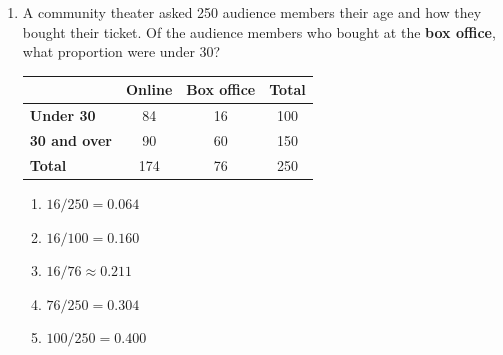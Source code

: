 \documentclass[12pt]{article}
\begin{document}
\begin{enumerate}[leftmargin=1.9em, itemsep=0.13in]

  \boxguard[12]
  \item \begin{minipage}[t]{0.44\linewidth}\raggedright
        A community theater asked 250 audience members their age and how they bought their
        ticket. Of the audience members who bought at the \textbf{box office}, what proportion
        were under 30?
        \end{minipage}\hfill
        \begin{minipage}[t]{0.52\linewidth}
        \centering\small
        \renewcommand{\arraystretch}{1.15}
        \begin{tabular}[t]{@{} l | c c | c @{}}
         & \textbf{Online} & \textbf{Box office} & \textbf{Total} \\ \hline
        \textbf{Under 30} & 84 & 16 & 100 \\
        \textbf{30 and over} & 90 & 60 & 150 \\ \hline
        \textbf{Total} & 174 & 76 & 250 \\
        \end{tabular}
        \end{minipage}
        \begin{enumerate}[label=\textbf{(\Alph*)}, leftmargin=2.2em, itemsep=2pt]
          \item $16/250 = 0.064$
          \item $16/100 = 0.160$
          \item $16/76 \approx 0.211$
          \item $76/250 = 0.304$
          \item $100/250 = 0.400$\hfill{}\rule[-0.2in]{0pt}{0.48in}
        \end{enumerate}


\end{enumerate}
\end{document}
